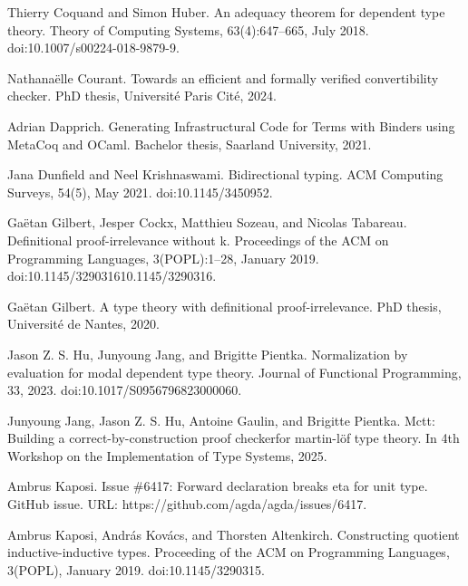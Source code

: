 \par\noindent  [17]  Thierry Coquand and Simon Huber.  An adequacy theorem for dependent type theory.  Theory of Computing Systems, 63(4):647–665, July 2018.  doi:10.1007/s00224-018-9879-9.  
 
\par\noindent  [18]  Nathanaëlle Courant.  Towards an efficient and formally verified convertibility checker.  PhD thesis, Université Paris Cité, 2024.  
 
\par\noindent  [19]  Adrian Dapprich.  Generating Infrastructural Code for Terms with Binders using MetaCoq and OCaml.  Bachelor thesis, Saarland University, 2021.  
 
\par\noindent  [20]  Jana Dunfield and Neel Krishnaswami.  Bidirectional typing.  ACM Computing Surveys, 54(5), May 2021.  doi:10.1145/3450952.  
 
\par\noindent  [21]  Gaëtan Gilbert, Jesper Cockx, Matthieu Sozeau, and Nicolas Tabareau.  Definitional proof-irrelevance without k.  Proceedings of the ACM on Programming Languages, 3(POPL):1–28, January 2019.  doi:10.1145/329031610.1145/3290316.  
 
\par\noindent  [22]  Gaëtan Gilbert.  A type theory with definitional proof-irrelevance.  PhD thesis, Université de Nantes, 2020.  
 
\par\noindent  [23]  Jason Z. S. Hu, Junyoung Jang, and Brigitte Pientka.  Normalization by evaluation for modal dependent type theory.  Journal of Functional Programming, 33, 2023.  doi:10.1017/S0956796823000060.  
 
\par\noindent  [24]  Junyoung Jang, Jason Z. S. Hu, Antoine Gaulin, and Brigitte Pientka.  Mctt: Building a correct-by-construction proof checkerfor martin-löf type theory.  In 4th Workshop on the Implementation of Type Systems, 2025.  
 
\par\noindent  [25]  Ambrus Kaposi.  Issue \#6417: Forward declaration breaks eta for unit type.  GitHub issue.  URL: https://github.com/agda/agda/issues/6417.  
 
\par\noindent  [26]  Ambrus Kaposi, András Kovács, and Thorsten Altenkirch.  Constructing quotient inductive-inductive types.  Proceeding of the ACM on Programming Languages, 3(POPL), January 2019.  doi:10.1145/3290315.  
 
